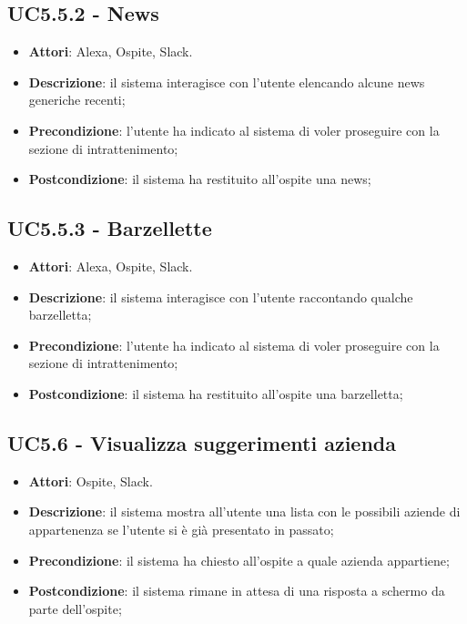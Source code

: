 \documentclass[../AnalisiDeiRequisiti.tex]{subfiles}
\begin{document}
\subsection{UC5.5.2 - News} 
\label{sssec:UC5.5.2} 
\begin{itemize} 
\item \textbf{Attori}: Alexa, Ospite, Slack.
\item \textbf{Descrizione}: il sistema interagisce con l'utente elencando alcune news generiche recenti;
\item \textbf{Precondizione}: l'utente ha indicato al sistema di voler proseguire con la sezione di intrattenimento;
\item \textbf{Postcondizione}: il sistema ha restituito all'ospite una news;
\end{itemize} 
\subsection{UC5.5.3 - Barzellette} 
\label{sssec:UC5.5.3} 
\begin{itemize} 
\item \textbf{Attori}: Alexa, Ospite, Slack.
\item \textbf{Descrizione}: il sistema interagisce con l'utente raccontando qualche barzelletta;
\item \textbf{Precondizione}: l'utente ha indicato al sistema di voler proseguire con la sezione di intrattenimento;
\item \textbf{Postcondizione}: il sistema ha restituito all'ospite una barzelletta;
\end{itemize} 
\subsection{UC5.6 - Visualizza suggerimenti azienda} 
\label{sssec:UC5.6} 
\begin{itemize} 
\item \textbf{Attori}: Ospite, Slack.
\item \textbf{Descrizione}: il sistema mostra all'utente una lista con le possibili aziende di appartenenza se l'utente si è già presentato in passato;
\item \textbf{Precondizione}: il sistema ha chiesto all'ospite a quale azienda appartiene;
\item \textbf{Postcondizione}: il sistema rimane in attesa di una risposta a schermo da parte dell'ospite;
\end{itemize} 
\end{document}

